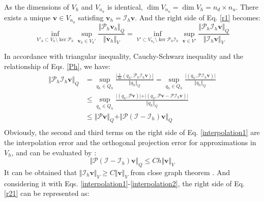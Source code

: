 \begin{pf}
    As the dimensions of $V_h$ and $V_{n_u}$ is identical, $\dim V_{n_u}=\dim V_h = n_d\times n_u$. There exists a unique $\boldsymbol v \in V_{n_u}$ satisfing $\boldsymbol v_h = \mathcal I_h \boldsymbol v$. And the right side of Eq. \eqref{r1} becomes:
\begin{equation}\label{r21}
\inf_{V'_h \subset V_h\setminus \ker \mathcal P_h}\sup_{\boldsymbol v_h \in V_h'} \frac{\Vert \mathcal P_h \boldsymbol v_h \Vert_Q}{\Vert \boldsymbol v_h \Vert_V} = 
\inf_{V'\subset V_{n_u}\setminus \ker \mathcal P_h \mathcal I_h}\sup_{\boldsymbol v \in V'} \frac{\Vert \mathcal P_h \mathcal I_h \boldsymbol v \Vert_Q}{\Vert \mathcal I_h \boldsymbol v \Vert_V}
\end{equation}

In accordance with triangular inequality, Cauchy-Schwarz inequality and the relationship of Eqs. \eqref{Ph}, we have:
\begin{equation}\label{interpolation1}
\begin{aligned}
    \Vert \mathcal P_h \mathcal I_h \boldsymbol v \Vert_Q &= 
    \sup_{q_h \in Q_h} \frac{\left \vert \frac{1}{3\kappa}(q_h, \mathcal P_h \mathcal I_h \boldsymbol v) \right \vert}{\Vert q_h \Vert_Q}
    =\sup_{q_h \in Q_h} \frac{\vert (q_h, \mathcal P \mathcal I_h \boldsymbol v) \vert}{\Vert q_h \Vert_Q} 
    \\
    &\le \sup_{q_h \in Q_h} \frac{\vert (q_h, \mathcal P \boldsymbol v)\vert + \vert (q_h, \mathcal P \boldsymbol v - \mathcal P \mathcal I_h \boldsymbol v) \vert}{\Vert q_h \Vert_Q} 
    \\
    &\le \Vert \mathcal P \boldsymbol v \Vert_Q
    + \Vert \mathcal P(\mathcal I - \mathcal I_h) \boldsymbol v \Vert_Q \\
\end{aligned}
\end{equation}
Obviously, the second and third terms on the right side of Eq. \eqref{interpolation1} are the interpolation error and the orthogonal projection error for approximations in $V_h$, and can be evaluated by \cite{yosida1995}:
\begin{equation}
\label{interpolation2}
    \Vert \mathcal P(\mathcal I - \mathcal I_h) \boldsymbol v \Vert_Q \le Ch \Vert \boldsymbol v \Vert_{V} 
\end{equation}
    It can be obtained that $\Vert \mathcal I_h \boldsymbol v\Vert_V \ge C\Vert \boldsymbol v \Vert_V$ from close graph theorem \cite{quarteroni1994}. And considering it with Eqs. \eqref{interpolation1}-\eqref{interpolation2}, the right side of Eq. \eqref{r21} can be represented as:

\end{pf}
